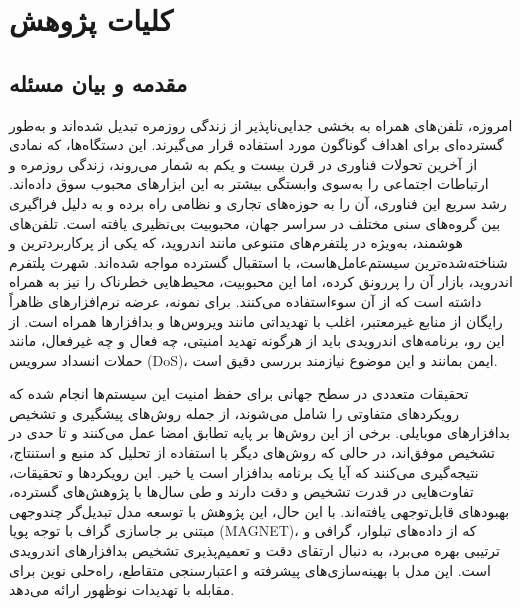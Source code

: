 \clearpage
\thispagestyle{empty}
\chapter{کلیات پژوهش}\label{chap1}
\section{مقدمه و بیان مسئله}\label{intro}
امروزه، تلفن‌های همراه به بخشی جدایی‌ناپذیر از زندگی روزمره تبدیل شده‌اند و به‌طور گسترده‌ای برای اهداف گوناگون مورد استفاده قرار می‌گیرند. این دستگاه‌ها، که نمادی از آخرین تحولات فناوری در قرن بیست و یکم به شمار می‌روند، زندگی روزمره و ارتباطات اجتماعی را به‌سوی وابستگی بیشتر به این ابزارهای محبوب سوق داده‌اند. رشد سریع این فناوری، آن را به حوزه‌های تجاری و نظامی راه برده و به دلیل فراگیری بین گروه‌های سنی مختلف در سراسر جهان، محبوبیت بی‌نظیری یافته است. تلفن‌های هوشمند، به‌ویژه در پلتفرم‌های متنوعی مانند اندروید، که یکی از پرکاربردترین و شناخته‌شده‌ترین سیستم‌عامل‌هاست، با استقبال گسترده مواجه شده‌اند. شهرت پلتفرم اندروید، بازار آن را پررونق کرده، اما این محبوبیت، محیط‌هایی خطرناک را نیز به همراه داشته است که از آن سوءاستفاده می‌کنند. برای نمونه، عرضه نرم‌افزارهای ظاهراً رایگان از منابع غیرمعتبر، اغلب با تهدیداتی مانند ویروس‌ها و بدافزارها همراه است. از این رو، برنامه‌های اندرویدی باید از هرگونه تهدید امنیتی، چه فعال و چه غیرفعال، مانند حملات انسداد سرویس (DoS)، ایمن بمانند و این موضوع نیازمند بررسی دقیق است.

تحقیقات متعددی در سطح جهانی برای حفظ امنیت این سیستم‌ها انجام شده که رویکردهای متفاوتی را شامل می‌شوند، از جمله روش‌های پیشگیری و تشخیص بدافزارهای موبایلی. برخی از این روش‌ها بر پایه تطابق امضا عمل می‌کنند و تا حدی در تشخیص موفق‌اند، در حالی که روش‌های دیگر با استفاده از تحلیل کد منبع و استنتاج، نتیجه‌گیری می‌کنند که آیا یک برنامه بدافزار است یا خیر. این رویکردها و تحقیقات، تفاوت‌هایی در قدرت تشخیص و دقت دارند و طی سال‌ها با پژوهش‌های گسترده، بهبودهای قابل‌توجهی یافته‌اند. با این حال، این پژوهش با توسعه مدل تبدیل‌گر چندوجهی مبتنی بر جاسازی گراف با توجه پویا (MAGNET)، که از داده‌های تبلوار، گرافی و ترتیبی بهره می‌برد، به دنبال ارتقای دقت و تعمیم‌پذیری تشخیص بدافزارهای اندرویدی است. این مدل با بهینه‌سازی‌های پیشرفته و اعتبارسنجی متقاطع، راه‌حلی نوین برای مقابله با تهدیدات نوظهور ارائه می‌دهد.


